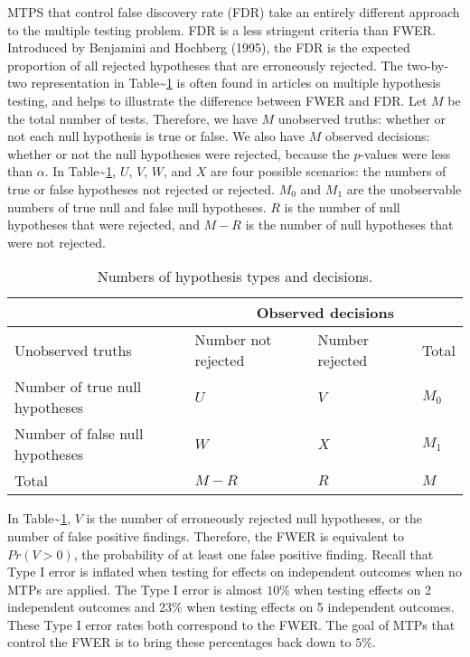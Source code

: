\documentclass[
]{article}
\begin{document}
MTPS that control false discovery rate (FDR) take an entirely different
approach to the multiple testing problem. FDR is a less stringent
criteria than FWER. Introduced by Benjamini and Hochberg (1995), the FDR
is the expected proportion of all rejected hypotheses that are
erroneously rejected. The two-by-two representation in
Table\textasciitilde{}\ref{tab:twobytwo} is often found in articles on
multiple hypothesis testing, and helps to illustrate the difference
between FWER and FDR. Let \(M\) be the total number of tests. Therefore,
we have \(M\) unobserved truths: whether or not each null hypothesis is
true or false. We also have \(M\) observed decisions: whether or not the
null hypotheses were rejected, because the \(p\)-values were less than
\(\alpha\). In Table\textasciitilde{}\ref{tab:twobytwo}, \(U\), \(V\),
\(W\), and \(X\) are four possible scenarios: the numbers of true or
false hypotheses not rejected or rejected. \(M_0\) and \(M_1\) are the
unobservable numbers of true null and false null hypotheses. \(R\) is
the number of null hypotheses that were rejected, and \(M - R\) is the
number of null hypotheses that were not rejected.

\begin{table}[h!]
\centering
\begin{tabular}{l l l l}
                                      & \multicolumn{3}{c}{Observed decisions}\\ \hline
Unobserved truths                     & Number not rejected     & Number rejected   & Total \\ \hline
Number of true null hypotheses        & $U$                     & $V$               & $M_0$ \\
Number of false null hypotheses       & $W$                     & $X$               & $M_1$ \\ \hline
Total                                 & $M-R$                   & $R$               & $M$
\end{tabular}
\caption{Numbers of hypothesis types and decisions.}
  \label{tab:twobytwo}
\end{table}

In Table\textasciitilde{}\ref{tab:twobytwo}, \(V\) is the number of
erroneously rejected null hypotheses, or the number of false positive
findings. Therefore, the FWER is equivalent to \(Pr(V > 0)\), the
probability of at least one false positive finding. Recall that Type I
error is inflated when testing for effects on independent outcomes when
no MTPs are applied. The Type I error is almost \(10\%\) when testing
effects on 2 independent outcomes and \(23\%\) when testing effects on 5
independent outcomes. These Type I error rates both correspond to the
FWER. The goal of MTPs that control the FWER is to bring these
percentages back down to \(5\%\).
\end{document}
